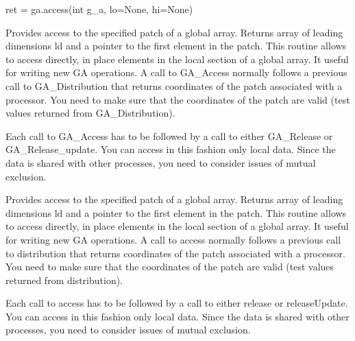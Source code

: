 \documentclass[12pt]{article}
\begin{document}
\begin{pyapi}
\begin{pycode}
ret = ga.access(int g_a, lo=None, hi=None)
\end{pycode}
\begin{funcargs}
\end{funcargs}
\end{pyapi}

\local

\begin{cdesc}

Provides access to the specified patch of a global array. Returns array of
leading dimensions ld and a pointer to the first element in the patch.  This
routine allows to access directly, in place elements in the local section of a
global array. It useful for writing new GA operations. A call to GA_Access
normally follows a previous call to GA_Distribution that returns coordinates of
the patch associated with a processor. You need to make sure that the
coordinates of the patch are valid (test values returned from GA_Distribution).

Each call to GA_Access has to be followed by a call to either GA_Release or
GA_Release_update. You can access in this fashion only local data.  Since the
data is shared with other processes, you need to consider issues of mutual
exclusion.

\end{cdesc}

\begin{cxxdesc}

Provides access to the specified patch of a global array. Returns array of
leading dimensions ld and a pointer to the first element in the patch.  This
routine allows to access directly, in place elements in the local section of a
global array. It useful for writing new GA operations. A call to access
normally follows a previous call to distribution that returns coordinates of
the patch associated with a processor. You need to make sure that the
coordinates of the patch are valid (test values returned from distribution).

Each call to access has to be followed by a call to either release or
releaseUpdate. You can access in this fashion only local data.  Since the
data is shared with other processes, you need to consider issues of mutual
exclusion.

\end{cxxdesc}
\end{document}
